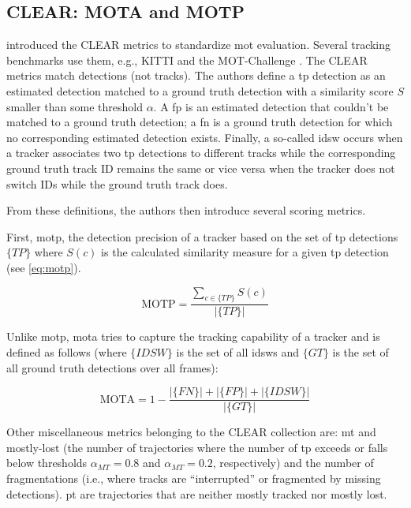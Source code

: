 \documentclass[headsepline, hidelinks, footsepline, footinclude=false, oneside, fontsize=11pt, paper=a4, listof=totoc, bibliography=totoc]{scrbook}
\begin{document}
\subsection{CLEAR: MOTA and MOTP \label{clear-metrics}}
\label{sec:orgb66ecf3}
    \cite{bernardinEvaluatingMultipleObject2008} introduced the CLEAR metrics to standardize \gls{mot} evaluation. Several tracking benchmarks use them, e.g., KITTI \cite{geigerVisionMeetsRobotics2013} and the MOT-Challenge \cite{dendorferMOTChallengeBenchmarkSingleCamera2020}.
The CLEAR metrics match detections (not tracks). The authors define a \gls{tp} detection as an estimated detection matched to a ground truth detection with a similarity score \(S\) smaller than some threshold \(\alpha\). 
A \gls{fp} is an estimated detection that couldn't be matched to a ground truth detection; a \gls{fn} is a ground truth detection for which no corresponding estimated detection exists. 
Finally, a so-called \gls{idsw} occurs when a tracker associates two \gls{tp} detections to different tracks while the corresponding ground truth track ID remains the same or vice versa when the tracker does not switch IDs while
the ground truth track does. 

From these definitions, the authors then introduce several scoring metrics.

First, \gls{motp}, the detection precision of a tracker based on the set of \gls{tp} detections \(\{TP\}\) where \(S(c)\) is the calculated similarity measure for a given \gls{tp} detection (see \cref{eq:motp}).

\begin{equation}
\label{eq:motp}
    \text{MOTP} = \frac{\sum_{c \in \{TP\}}S(c)}{|\{TP\}|}
\end{equation}

Unlike \gls{motp}, \gls{mota} tries to capture the tracking capability of a tracker and is defined as follows (where \(\{IDSW\}\) is the set of all \glspl{idsw} and \(\{GT\}\) is the set of all ground truth detections over all frames):

\begin{equation}
    \text{MOTA} = 1 - \frac{|\{FN\}| + |\{FP\}| +|\{IDSW\}|}{|\{GT\}|}
\end{equation}

Other miscellaneous metrics belonging to the CLEAR collection are:
\gls{mt} and \gls{mostly-lost} (the number of trajectories where the number of \gls{tp} exceeds or falls below thresholds \(\alpha_{MT}=0.8\) and \(\alpha_{MT}=0.2\), respectively) and the number of fragmentations (i.e., where tracks are ``interrupted'' or fragmented by missing detections).
\gls{pt} are trajectories that are neither mostly tracked nor mostly lost. 
\end{document}
